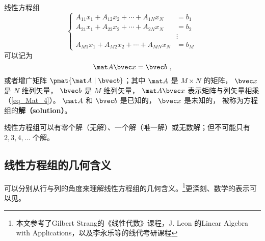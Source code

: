 
\begin{issues}
\issueDraft
\end{issues}


线性方程组
\begin{equation}
\begin{cases}
A_{11} x_1 + A_{12} x_2 + \cdots + A_{1N} x_N &= b_1 \\
A_{21} x_1 + A_{22} x_2 + \cdots + A_{2N} x_N &= b_2 \\
&\vdots \\
A_{M1} x_1 + A_{M2} x_2 + \cdots + A_{MN} x_N &= b_M
\end{cases} ~
\end{equation}
可以记为
\begin{equation}\label{eq_LinEq_1}
\mat A \bvec x = \bvec b~,
\end{equation}
或者增广矩阵 $\pmat{\mat A \mid \bvec b}$；其中 $\mat A$ 是 $M \times N$ 的矩阵， $\bvec x$ 是 $N$ 维列矢量， $\bvec b$ 是 $M$ 维列矢量， $\mat A \bvec x$ 表示矩阵与列矢量相乘（\autoref{eq_Mat_4}）。 $\mat A$ 和 $\bvec b$ 是已知的， $\bvec x$ 是未知的， 被称为方程组的\textbf{解（solution）}。

线性方程组可以有零个解（无解）、一个解（唯一解）或无数解；但不可能只有 $2,3,4,\dots$ 个解。


\subsection{线性方程组的几何含义}\label{sub_LinEq_2}
可以分别从行与列的角度来理解线性方程组的几何含义。\footnote{本文参考了Gilbert Strang的《线性代数》课程，J. Leon 的Linear Algebra with Applications，以及李永乐等的线代考研课程}更深刻、数学的表示可以见。

